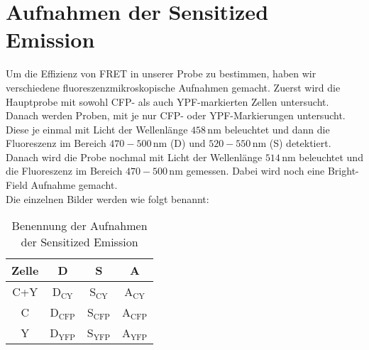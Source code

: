 \section{Aufnahmen der Sensitized Emission}
Um die Effizienz von FRET in unserer Probe zu bestimmen, haben wir verschiedene fluoreszenzmikroskopische Aufnahmen gemacht.
Zuerst wird die Hauptprobe mit sowohl CFP- als auch YPF-markierten Zellen untersucht.
Danach werden Proben, mit je nur CFP- oder YPF-Markierungen untersucht.
Diese je einmal mit Licht der Wellenlänge $458\,\text{nm}$ beleuchtet und dann die Fluoreszenz im Bereich $470-500\,\text{nm}$ (D) und $520-550\,\text{nm}$ (S) detektiert.
Danach wird die Probe nochmal mit Licht der Wellenlänge $514\,\text{nm}$ beleuchtet und die Fluoreszenz im Bereich $470-500\,\text{nm}$ gemessen.
Dabei wird noch eine Bright-Field Aufnahme gemacht.\\
Die einzelnen Bilder werden wie folgt benannt:
\begin{table}[h]
    \centering\begin{tabular}{c|ccc}
        Zelle & D & S & A\\
        \hline
        C+Y & D$_\text{CY}$ & S$_\text{CY}$ & A$_\text{CY}$\\
        C & D$_\text{CFP}$ & S$_\text{CFP}$ & A$_\text{CFP}$\\
        Y & D$_\text{YFP}$ & S$_\text{YFP}$ & A$_\text{YFP}$
    \end{tabular}
    \caption{Benennung der Aufnahmen der Sensitized Emission}
\end{table}
